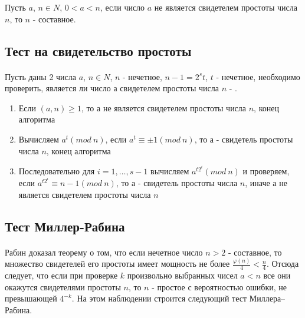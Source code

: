   \begin{statement}   
  
      Пусть {$a$}, {$n \in N$}, {$0 < a < n$}, если число {$a$} не является свидетелем 
    простоты числа {$n$}, то {$n$} - составное.
    
  \end{statement}

\subsection{Тест на свидетельство простоты}

\paragraph{} Пусть даны 2 числа {$a$}, {$n \in N$}, {$n$} - нечетное, {$n - 1 = 2^{ s} t$}, 
{$t$} - нечетное, необходимо проверить, является ли число {$а$} свидетелем простоты числа {$n$} - \cite[Глава 5, страницы 169-170]{mah06}.

  \begin{enumerate}
   \item Если {$(a, n) \ge 1$}, то {$а$} не является свидетелем простоты числа {$n$}, конец алгоритма
   \item Вычисляем {$a^{ t} (mod \: n)$}, если {$a^{ t} \equiv \pm 1(mod \: n)$}, то {$а$}
    - свидетель простоты числа {$n$}, конец алгоритма
   \item Последовательно для {$i=1, \dots, s - 1$} вычисляем {$a^{ t 2^{ i}}(mod \: n)$} и 
    проверяем, если {$a^{ t 2^{ i}} \equiv n - 1 (mod \: n)$}, то {$а$} - 
    свидетель простоты числа {$n$}, иначе {$а$} не является свидетелем простоты числа {$n$}
  \end{enumerate}

  
\subsection{Тест Миллер-Рабина}

\paragraph{} Рабин доказал теорему о том, что если нечетное число $n > 2$ - составное, то множество свидетелей его простоты имеет мощность не более
$\frac{\varphi(n)}{4} < \frac{n}{4}$. Отсюда следует, что если при проверке $k$ произвольно выбранных чисел $a < n$ все они окажутся свидетелями простоты $n$, то $n$ -
простое с вероятностью ошибки, не превышающей $4^{ -k}$. На этом наблюдении строится следующий тест Миллера–Рабина.

